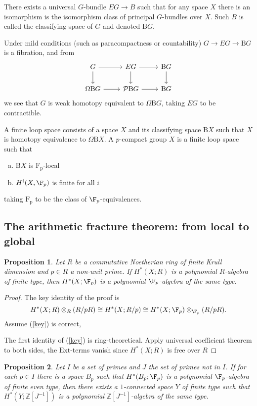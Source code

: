 \documentclass[psamsfonts]{amsart}
\newtheorem{prop}{Proposition}[section]
\theoremstyle{definition}
\newcommand{\Z}{\mathbb{Z}}
\newcommand{\B}{\mathrm{B}}
\numberwithin{equation}{section}
\begin{document}
There exists a universal $G$-bundle $EG\to B$ such that for any space $X$ there is an isomorphism  is the isomorphism class of principal $G$-bundles over $X$. Such $B$ is called the classifying space of $G$ and denoted $\B G$.

Under mild conditions (such as paracompactness or countability) $G\to EG\to\B G$ is a fibration, and from
\[\begin{tikzcd}
G\arrow[r]\arrow[d]&EG\arrow[r]\arrow[d]&\B G\arrow[d]\\
\Omega\B G\arrow[r]&\mathcal{P}\B G\arrow[r]&\B G
\end{tikzcd}\]
we see that $G$ is weak homotopy equivalent to $\Omega\B G$, taking $EG$ to be contractible.

A finite loop space consists of a space $X$ and its classifying space $\B X$ such that $X$ is homotopy equivalence to $\Omega\B X$. A $p$-compact group $X$ is a finite loop space such that\begin{enumerate}[(a)]
    \item $\B X$ is $\mathrm{F_p}$-local
    \item $H^i(X,\F_p)$ is finite for all $i$
\end{enumerate}
taking $\mathrm{F_p}$ to be the class of $\F_p$-equivalences.

\subsection{The arithmetic fracture theorem: from local to global}

\begin{prop}
Let $R$ be a commutative Noetherian ring of finite Krull dimension and $p\in R$ a non-unit prime. If $H^\ast(X;R)$ is a polynomial $R$-algebra of finite type, then $H^\ast(X;\F_p)$ is a polynomial $\F_p$-algebra of the same type.
\end{prop}
\begin{proof}
The key identity of the proof is
\begin{equation}\label{key} H^\ast(X;R)\otimes_R (R/pR)\cong H^\ast(X;R/p)\cong H^\ast(X;\F_p)\otimes_{\F_p}(R/pR).
\end{equation}
Assume (\ref{key}) is correct, \medbreak

The first identity of (\ref{key}) is ring-theoretical. Apply universal coefficient theorem to both sides, the $\mathrm{Ext}$-terms vanish since $H^\ast(X;R)$ is free over $R$
\end{proof}


\begin{prop}
Let $I$ be a set of primes and $J$ the set of primes not in $I$. If for each $p\in I$ there is a space $B_p$ such that $H^\ast(B_p;\F_p)$ is a polynomial $\F_p$-algebra of finite even type, then there exists a $1$-connected space $Y$ of finite type such that $H^\ast(Y;\Z[J^{-1}])$ is a polynomial $\Z[J^{-1}]$-algebra of the same type.
\end{prop}
\end{document}
